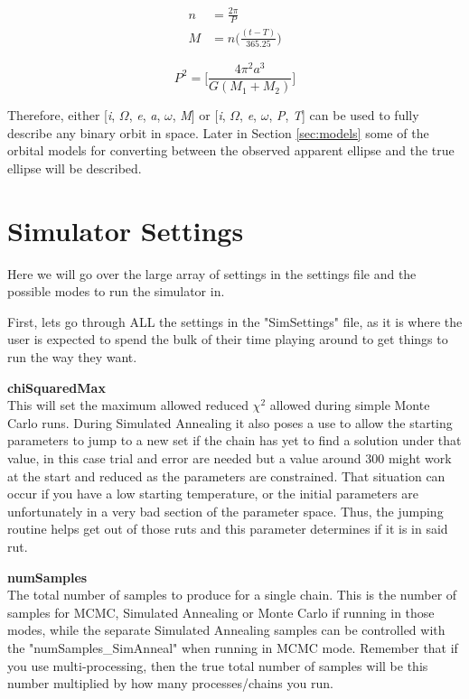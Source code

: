 \documentclass[12pt,preprint]{aastex}
\begin{document}
\begin{subequations}
\begin{align}\label{eq:nAndMa}
n &= \frac{2\pi}{P} \\
\label{eq:nAndMb}
M &= n \bigg( \frac{(t-T)}{365.25} \bigg)
\end{align}
\end{subequations}

\begin{equation}\label{eq:KepThird}
P^2 = \bigg[\frac{4\pi^2a^3}{G(M_1+M_2)} \bigg]
\end{equation}

Therefore, either [{\it i}, $\Omega$, {\it e}, {\it a}, $\omega$, {\it M}] or [{\it i}, $\Omega$, {\it e}, $\omega$, {\it P}, {\it T}] can be used to fully describe any binary orbit in space.  Later in Section \ref{sec:models} some of the orbital models for converting between the observed apparent ellipse and the true ellipse will be described. 

\clearpage

\section{Simulator Settings}\label{sec:simSettings}

Here we will go over the large array of settings in the settings file and the possible modes to run the simulator in.

First, lets go through ALL the settings in the "SimSettings" file, as it is where the user is expected to spend the bulk of their time playing around to get things to run the way they want.

{\bf chiSquaredMax}\\
This will set the maximum allowed reduced $\chi^2$ allowed during simple Monte Carlo runs.  During Simulated Annealing it also poses a use to allow the starting parameters to jump to a new set if the chain has yet to find a solution under that value, in this case trial and error are needed but a value around 300 might work at the start and reduced as the parameters are constrained.  That situation can occur if you have a low starting temperature, or the initial parameters are unfortunately in a very bad section of the parameter space.  Thus, the jumping routine helps get out of those ruts and this parameter determines if it is in said rut.

{\bf numSamples}\\
The total number of samples to produce for a single chain.  This is the number of samples for MCMC, Simulated Annealing or Monte Carlo if running in those modes, while the separate Simulated Annealing samples can be controlled with the "numSamples\_SimAnneal" when running in MCMC mode.  Remember that if you use multi-processing, then the true total number of samples will be this number multiplied by how many processes/chains you run.
\end{document}
